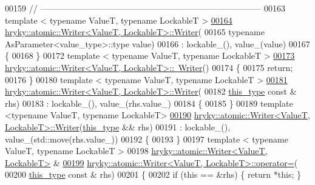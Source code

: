 \begin{DoxyCode}
{00159 \textcolor{comment}{//
      ------------------------------------------------------------------------------}
00163 \textcolor{comment}{}\textcolor{keyword}{template} < \textcolor{keyword}{typename} ValueT, \textcolor{keyword}{typename} LockableT >
\hypertarget{atomic__writer_8h_source_l00164}{}\hyperlink{group__atomic__operation_gac68031a9e2acf0fd451ef9daa9e5efd2}{00164} \hyperlink{classhryky_1_1atomic_1_1_writer_a7fd174cd5efde82187ab66bf00bd742a}{hryky::atomic::Writer<ValueT, LockableT>::Writer}(
00165     \textcolor{keyword}{typename} AsParameter<value\_type>::type value)
00166     : lockable\_(), value\_(value)
00167 \{
00168 \}
00172 \textcolor{keyword}{template} < \textcolor{keyword}{typename} ValueT, \textcolor{keyword}{typename} LockableT >
\hypertarget{atomic__writer_8h_source_l00173}{}\hyperlink{group__atomic__operation_ga93eb8e0b170241286e90fec300b48d9a}{00173} \hyperlink{classhryky_1_1atomic_1_1_writer}{hryky::atomic::Writer<ValueT, LockableT>::~Writer}()
00174 \{
00175     \textcolor{keywordflow}{return};
00176 \}
00180 \textcolor{keyword}{template} < \textcolor{keyword}{typename} ValueT, \textcolor{keyword}{typename} LockableT >
\hypertarget{atomic__writer_8h_source_l00181}{}\hyperlink{group__atomic__operation_gac0872ceccd99b51c0f258fe05deca6c0}{00181} \hyperlink{classhryky_1_1atomic_1_1_writer}{hryky::atomic::Writer<ValueT, LockableT>::Writer}(
00182     \hyperlink{classhryky_1_1atomic_1_1_writer}{this_type} \textcolor{keyword}{const} & rhs)
00183     : lockable\_(), value\_(rhs.value\_)
00184 \{
00185 \}
00189 \textcolor{keyword}{template} <\textcolor{keyword}{typename} ValueT, \textcolor{keyword}{typename} LockableT>
\hypertarget{atomic__writer_8h_source_l00190}{}\hyperlink{group__atomic__operation_ga2f399901b313d5e92f891e24d08f3079}{00190} \hyperlink{classhryky_1_1atomic_1_1_writer}{hryky::atomic::Writer<ValueT, LockableT>::Writer}(\hyperlink{classhryky_1_1atomic_1_1_writer}{this_type} && rhs)
00191     : lockable\_(), value\_(std::move(rhs.value\_))
00192 \{
00193 \}
00197 \textcolor{keyword}{template} < \textcolor{keyword}{typename} ValueT, \textcolor{keyword}{typename} LockableT >
00198 \hyperlink{classhryky_1_1atomic_1_1_writer}{hryky::atomic::Writer<ValueT, LockableT>} & 
\hypertarget{atomic__writer_8h_source_l00199}{}\hyperlink{group__atomic__operation_gab5e4c7b8fa6d6c4e791f7f8f651de97f}{00199} \hyperlink{classhryky_1_1atomic_1_1_writer}{hryky::atomic::Writer<ValueT, LockableT>::operator=}(
00200     \hyperlink{classhryky_1_1atomic_1_1_writer}{this_type} \textcolor{keyword}{const} & rhs)
00201 \{
00202     \textcolor{keywordflow}{if} (\textcolor{keyword}{this} == &rhs) \{ \textcolor{keywordflow}{return} *\textcolor{keyword}{this}; \}
}
\end{DoxyCode}
